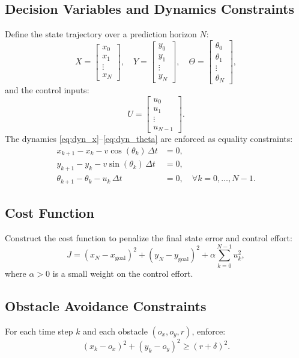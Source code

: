 \documentclass[11pt]{article}
\begin{document}
\subsection{Decision Variables and Dynamics Constraints}
Define the state trajectory over a prediction horizon $N$:
\[
X = \begin{bmatrix} x_0 \\ x_1 \\ \vdots \\ x_N \end{bmatrix}, \quad
Y = \begin{bmatrix} y_0 \\ y_1 \\ \vdots \\ y_N \end{bmatrix}, \quad
\Theta = \begin{bmatrix} \theta_0 \\ \theta_1 \\ \vdots \\ \theta_N \end{bmatrix},
\]
and the control inputs:
\[
U = \begin{bmatrix} u_0 \\ u_1 \\ \vdots \\ u_{N-1} \end{bmatrix}.
\]
The dynamics \eqref{eq:dyn_x}--\eqref{eq:dyn_theta} are enforced as equality constraints:
\[
\begin{aligned}
    x_{k+1} - x_k - v \cos(\theta_k)\, \Delta t &= 0, \\
    y_{k+1} - y_k - v \sin(\theta_k)\, \Delta t &= 0, \\
    \theta_{k+1} - \theta_k - u_k\, \Delta t &= 0, \quad \forall k=0,\ldots,N-1.
\end{aligned}
\]

\subsection{Cost Function}
Construct the cost function to penalize the final state error and control effort:
\[
J = \left( x_N - x_{\text{goal}} \right)^2 + \left( y_N - y_{\text{goal}} \right)^2 + \alpha \sum_{k=0}^{N-1} u_k^2,
\]
where $\alpha > 0$ is a small weight on the control effort.

\subsection{Obstacle Avoidance Constraints}
For each time step $k$ and each obstacle $(o_x, o_y, r)$, enforce:
\[
(x_k - o_x)^2 + (y_k - o_y)^2 \ge (r + \delta)^2.
\]
\end{document}
